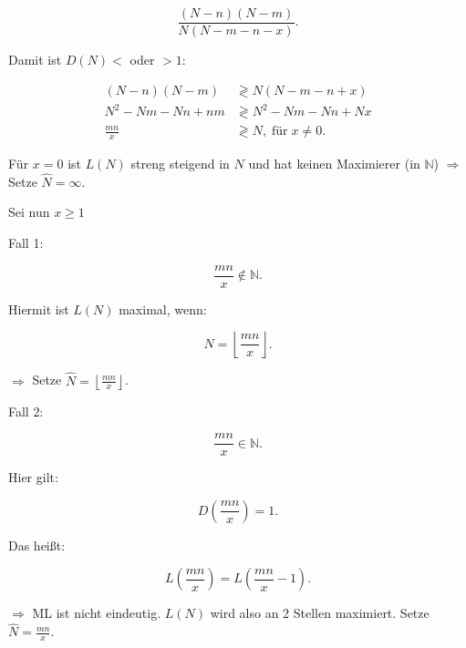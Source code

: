 \documentclass[10pt]{article}
\newenvironment{BSP}[1][]
{\begin{Beispiel}[frametitle=#1]}{\end{Beispiel}}
\begin{document}
\begin{BSP}[Beispiel 1.0000 Schätzung der Populationsgröße mit der Capture/Recapture-Methode]
		\begin{equation*}
			\frac{(N-n) (N-m)}{N (N - m - n -x)}.
		\end{equation*}
		
		Damit ist $D(N) <$ oder $>1$:
		
		\begin{equation*}
			\begin{split}
				(N-n) (N-m) &\gtrless  N(N-m-n+x) \\
				N^2 - Nm - Nn +nm &\gtrless N^2 -Nm-Nn+Nx\\
				\frac{mn}{x} &\gtrless N, \; \text{für} \; x\neq 0.
			\end{split}
		\end{equation*}
		
		Für $x = 0$ ist $L(N)$ streng steigend in $N$ und hat keinen Maximierer (in $\mathbb{N}$) $\Rightarrow$ Setze $\hat{N} = \infty$.
		
		Sei nun $x\geq 1$
		
		Fall 1:
		
		\begin{equation*}
			\frac{mn}{x} \notin \mathbb{N}.
		\end{equation*}
		
		Hiermit ist $L(N)$ maximal, wenn:
		
		\begin{equation*}
			N = \left\lfloor \frac{mn}{x} \right\rfloor. 
		\end{equation*}
		
		$\Rightarrow$ Setze $\hat{N} = \left\lfloor \frac{mn}{x} \right\rfloor$. 
		
		Fall 2:
		
		\begin{equation*}
			\frac{mn}{x} \in \mathbb{N}.
		\end{equation*}
		
		Hier gilt:
		
		\begin{equation*}
			D\left(\frac{mn}{x}\right) = 1.
		\end{equation*}
		
		Das heißt:
		
		\begin{equation*}
			L\left(\frac{mn}{x}\right) = L\left(\frac{mn}{x} -1\right).
		\end{equation*}
		
		$\Rightarrow$ ML ist nicht eindeutig. $L(N)$ wird also an 2 Stellen maximiert. Setze $\hat{N} = \frac{mn}{x}$.
		

\end{BSP}
\end{document}
